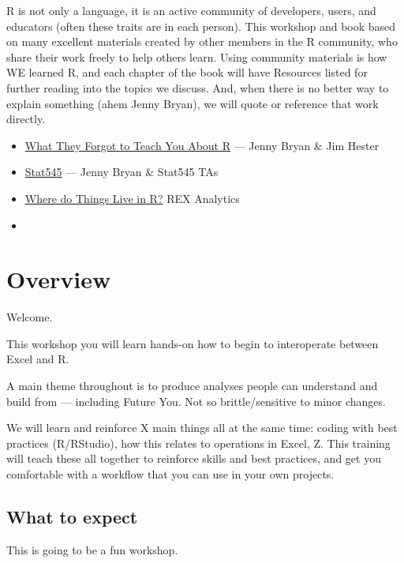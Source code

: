 \documentclass[]{book}
\providecommand{\tightlist}{%
  \setlength{\itemsep}{0pt}\setlength{\parskip}{0pt}}
\begin{document}
R is not only a language, it is an active community of developers, users, and educators (often these traits are in each person). This workshop and book based on many excellent materials created by other members in the R community, who share their work freely to help others learn. Using community materials is how WE learned R, and each chapter of the book will have Resources listed for further reading into the topics we discuss. And, when there is no better way to explain something (ahem Jenny Bryan), we will quote or reference that work directly.

\begin{itemize}
\tightlist
\item
  \href{https://whattheyforgot.org/}{What They Forgot to Teach You About R} --- Jenny Bryan \& Jim Hester
\item
  \href{https://stat545.com/}{Stat545} --- Jenny Bryan \& Stat545 TAs
\item
  \href{http://rex-analytics.com/things-live-r-r-excel-users/}{Where do Things Live in R?} REX Analytics
\item
  \href{https://blog.shotwell.ca/posts/r_for_excel_users/}{}
\end{itemize}

\hypertarget{overview-1}{%
\section{Overview}\label{overview-1}}

Welcome.

This workshop you will learn hands-on how to begin to interoperate between Excel and R.

A main theme throughout is to produce analyses people can understand and build from --- including Future You.
Not so brittle/sensitive to minor changes.

We will learn and reinforce X main things all at the same time: coding with best practices (R/RStudio), how this relates to operations in Excel, Z. This training will teach these all together to reinforce skills and best practices, and get you comfortable with a workflow that you can use in your own projects.

\hypertarget{what-to-expect}{%
\subsection{What to expect}\label{what-to-expect}}

This is going to be a fun workshop.
\end{document}
